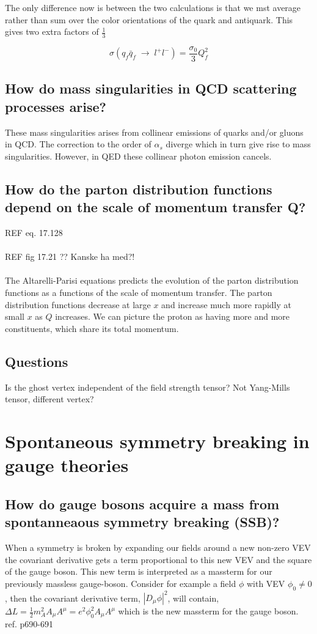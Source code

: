 \documentclass[paper=a4, fontsize=11pt]{scrartcl} %
\numberwithin{equation}{section} %
\numberwithin{figure}{section} %
\numberwithin{table}{section} %
\begin{document}
The only difference now is between the two calculations is that we mst average rather than sum over the color orientations of the quark and antiquark. This gives two extra factors of $\frac{1}{3}$

\begin{equation}
\sigma(q_f\bar{q}_f \; \rightarrow \; l^+l^-) = \frac{\sigma_0}{3}Q_f^2
\end{equation}

\subsection{How do mass singularities in QCD scattering processes arise?}

These mass singularities arises from collinear emissions of quarks and/or gluons in QCD. The correction to the order of $\alpha_s$ diverge which in turn give rise to mass singularities. However, in QED these collinear photon emission cancels.

\subsection{How do the parton distribution functions depend on the scale of momentum transfer Q?}

REF eq. 17.128 \\
\\
REF fig 17.21 ?? Kanske ha med?! \\
\\

The Altarelli-Parisi equations predicts the evolution of the parton distribution functions as a functions of the scale of momentum transfer. The parton distribution functions decrease at large $x$ and increase much more rapidly at small $x$ as $Q$ increases. We can picture the proton as having more and more constituents, which share its total momentum.

\subsection{Questions}
Is the ghost vertex independent of the field strength tensor? Not Yang-Mills tensor, different vertex?

\section{Spontaneous symmetry breaking in gauge theories}


\subsection*{How do gauge bosons acquire a mass from spontanneaous symmetry breaking (SSB)?}
When a symmetry is broken by expanding our fields around a new non-zero VEV the covariant derivative gets a term proportional to this new VEV and the square of the gauge boson. This new term is interpreted as a massterm for our previously massless gauge-boson.
Consider for example a field $\phi$ with VEV $\phi_0 \neq 0$, then the covariant derivative term, $|D_{\mu} \phi|^2$, will contain, $\Delta L = \frac{1}{2}m_A^2 A_{\mu}A^{\mu} = e^2 \phi_0^2 A_{\mu}A^{\mu}$ which is the new massterm for the gauge boson.
ref. p690-691
\end{document}
